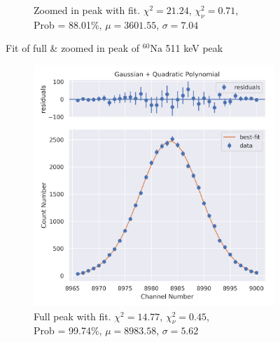 \documentclass[11pt,a4paper]{article}
\newcommand{\element}[2]{$^{#2}\textrm{#1}$}
\begin{document}
\begin{figure}[H]
\begin{subfigure}{.5\linewidth}
    \caption{Zoomed in peak with fit. $\chi^2 = 21.24$, $\chi^2_\nu = 0.71$, \\ Prob = 88.01\%, $\mu = 3601.55$, $\sigma = 7.04$}
  \end{subfigure}
  \caption{Fit of full \& zoomed in peak of \element{Na}{60} 511 keV peak}
\end{figure}
\begin{figure}[H]
  \centering
  \begin{subfigure}{.5\linewidth}
    \centering
    \includegraphics[width=\linewidth]{./Images/Sodium22/Quad/Quad_2_Full.png}
    \caption{Full peak with fit. $\chi^2 = 14.77$, $\chi^2_\nu = 0.45$, \\ Prob = 99.74\%, $\mu = 8983.58$, $\sigma = 5.62$}
  \end{subfigure}%
  \begin{subfigure}{.5\linewidth}
    \centering

\end{subfigure}
\end{figure}
\end{document}
